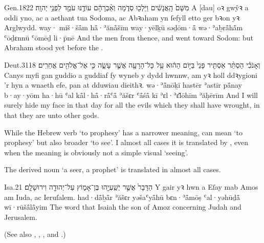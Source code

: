 \begin{example}{Gen.}{18}{22}{}{}
	\quoling
	{ מִשָּׁם֙ הָֽאֲנָשִׁ֔ים וַיֵּלְכ֖וּ סְדֹ֑מָה וְאַ֨בְרָהָ֔ם עוֹדֶ֥נּוּ עֹמֵ֖ד לִפְנֵ֥י יְהוָֽה׃}
	{A [dau] oꝛ gwŷꝛ a  oddi yno, ac a aethant tua Sodoma, ac Abꝛaham yn ſefyll  etto ger bꝛon yꝛ Arglwydd.}
	{way· miš·šå̄m hå̄·ʾănå̄šīm way·yēlḵū səḏōm·å̄ wə·ʾaḇrå̄hå̄m ʿōḏɛnnū ʿōmēḏ li·p̄nē {\YHWH}}
	{And the men  from thence, and went toward Sodom: but Abraham stood yet before the {\LORD}.}
\end{example}

\begin{example}{Deut.}{31}{18}{}{}
	\quoling
	{וְאָנֹכִ֗י הַסְתֵּ֨ר אַסְתִּ֤יר פָּנַי֙ בַּיּ֣וֹם הַה֔וּא עַ֥ל כָּל־הָרָעָ֖ה אֲשֶׁ֣ר עָשָׂ֑ה כִּ֣י  אֶל־אֱלֹהִ֖ים אֲחֵרִֽים׃}
	{Canys myfi gan guddio a guddiaf fy wyneb y dydd hwnnw, am yꝛ holl ddꝛygioni ’r hyn a wnaeth efe, pan  at dduwiau dieithꝛ.}
	{wə·ʾå̄nōḵī hastēr ʾastīr på̄nay b·ay·yōm ha·hū ʿal kå̄l·hå̄·rå̄ʿå̄ ʾăšɛr ʿå̄śå̄ kī  ʾɛl·ʾɛ̆lōhīm ʾăḥērīm}
	{And I will surely hide my face in that day for all the evils which they shall have wrought, in that they are  unto other gods.}
\end{example}



\begin{paper}
	While the Hebrew verb  ‘to prophesy’ has a narrower meaning,  can mean ‘to prophesy’ but also broader ‘to see’. I almost all cases it is translated by , even when the meaning is obviously not a simple visual ‘seeing’.

	The derived noun  ‘a seer, a prophet’ is translated  in almost all cases.
\end{paper}

\begin{example}{Isa.}{2}{1}{}{}
	\quoling
	{הַדָּבָר֙ אֲשֶׁ֣ר 	יְשַֽׁעְיָ֖הוּ בֶּן־אָמ֑וֹץ עַל־יְהוּדָ֖ה וִירוּשָׁלִָֽם׃}
	{Y gair yꝛ hwn a  Eſay mab Amos am Iuda, ac Ieruſalem.}
	{had·då̄ḇå̄r ʾăšɛr  yəšaʿyå̄hū bɛn·ʾå̄mōṣ ʿal·yəhūḏå̄ wī·rūšå̄lå̄yim}
	{The word that Isaiah the son of Amoz  concerning Judah and Jerusalem.}
\end{example}
(See also , , ,  and .)

